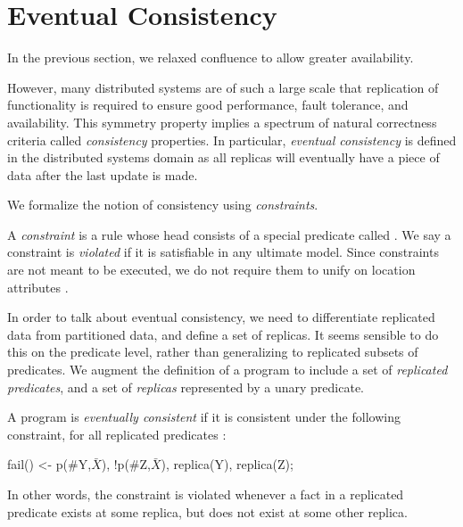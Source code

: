 \section{Eventual Consistency}

In the previous section, we relaxed confluence to allow greater availability.

However, many distributed systems are of such a large scale that replication of functionality is required to ensure good performance, fault tolerance, and availability.  This symmetry property implies a spectrum of natural correctness criteria called {\em consistency} properties.  In particular, {\em eventual consistency} is defined in the distributed systems domain as all replicas will eventually have a piece of data after the last update is made.


We formalize the notion of consistency using {\em constraints}.

\begin{definition}
A {\em constraint} is a rule whose head consists of a special predicate called .  We say a constraint is {\em violated} if it is satisfiable in any ultimate model.  Since constraints are not meant to be executed, we do not require them to unify on location attributes .
\end{definition}

In order to talk about eventual consistency, we need to differentiate replicated data from partitioned data, and define a set of replicas.  It seems sensible to do this on the predicate level, rather than generalizing to replicated subsets of predicates.  We augment the definition of a \lang program to include a set of {\em replicated predicates}, and a set of {\em replicas} represented by a unary  predicate.

\begin{definition}
\label{def:ec}
A \lang program is {\em eventually consistent} if it is consistent under the following constraint, for all replicated predicates :

\begin{Dedalus}
fail() <- p(#Y,\(\bar{X}\)), !p(#Z,\(\bar{X}\)), replica(Y), replica(Z);
\end{Dedalus}

In other words, the constraint is violated whenever a fact in a replicated predicate exists at some replica, but does not exist at some other replica.
\end{definition}

